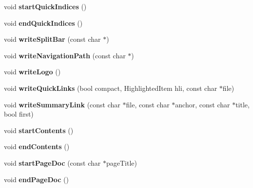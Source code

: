 \begin{DoxyCompactItemize}
void {\bfseries start\+Quick\+Indices} ()
\item 
\mbox{\label{class_docbook_generator_ac16f5ac648c949d8431859cebd71ce03}} 
void {\bfseries end\+Quick\+Indices} ()
\item 
\mbox{\label{class_docbook_generator_aabf42006b7f14083c4d31cc5f761620a}} 
void {\bfseries write\+Split\+Bar} (const char $\ast$)
\item 
\mbox{\label{class_docbook_generator_ad4fea50d4e2405700643381ea214fca8}} 
void {\bfseries write\+Navigation\+Path} (const char $\ast$)
\item 
\mbox{\label{class_docbook_generator_a2f56a6d8d8d097846ed90ad1af9bd21a}} 
void {\bfseries write\+Logo} ()
\item 
\mbox{\label{class_docbook_generator_a83835c0d52d94f5f4b9c02d75aaacb43}} 
void {\bfseries write\+Quick\+Links} (bool compact, Highlighted\+Item hli, const char $\ast$file)
\item 
\mbox{\label{class_docbook_generator_ae58e28b7788b52c349d1dbec47de2bcf}} 
void {\bfseries write\+Summary\+Link} (const char $\ast$file, const char $\ast$anchor, const char $\ast$title, bool first)
\item 
\mbox{\label{class_docbook_generator_a8dc16a29f77b7ac430cfc96c744209bf}} 
void {\bfseries start\+Contents} ()
\item 
\mbox{\label{class_docbook_generator_a86f57506d929c0d58e2a7d94539528ad}} 
void {\bfseries end\+Contents} ()
\item 
\mbox{\label{class_docbook_generator_a6dd72e1864255acf337330ede561f3b4}} 
void {\bfseries start\+Page\+Doc} (const char $\ast$page\+Title)
\item 
\mbox{\label{class_docbook_generator_abcdc8f3a537785ea0a2da646da1ce46b}} 
void {\bfseries end\+Page\+Doc} ()
\item 
\mbox{\label{class_docbook_generator_a144f38ae2e1ee232207a62f1a57514b0}} 

\end{DoxyCompactItemize}

